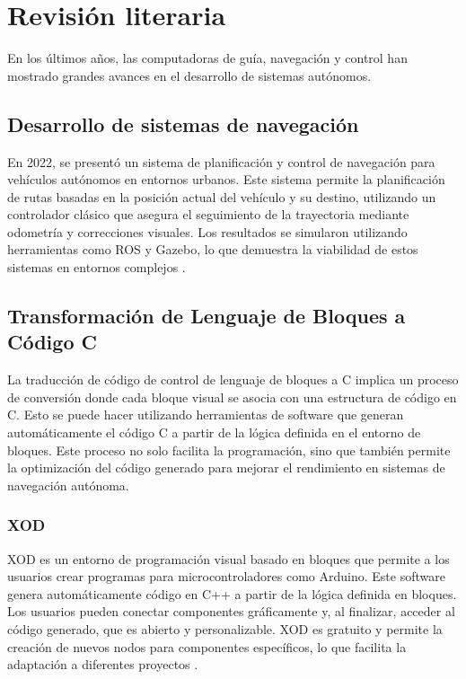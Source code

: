 \section{Revisión literaria}
En los últimos años, las computadoras de guía, navegación y control han mostrado grandes avances en el desarrollo de sistemas autónomos.

\subsection{Desarrollo de sistemas de navegación}

En 2022, se presentó un sistema de planificación y control de navegación para vehículos autónomos en entornos urbanos. Este sistema permite la planificación 
de rutas basadas en la posición actual del vehículo y su destino, utilizando un controlador clásico que asegura el seguimiento de la trayectoria mediante 
odometría y correcciones visuales. Los resultados se simularon utilizando herramientas como ROS y Gazebo, lo que demuestra la viabilidad de estos sistemas en 
entornos complejos \cite{BarreraRamrez2022SistemaDP}. 

\subsection{Transformación de Lenguaje de Bloques a Código C}

La traducción de código de control de lenguaje de bloques a C implica un proceso de conversión donde cada bloque visual se asocia con una estructura de código 
en C. Esto se puede hacer utilizando herramientas de software que generan automáticamente el código C a partir de la lógica definida en el entorno de bloques. 
Este proceso no solo facilita la programación, sino que también permite la optimización del código generado para mejorar el rendimiento en sistemas de navegación 
autónoma.

\subsubsection{XOD}

XOD es un entorno de programación visual basado en bloques que permite a los usuarios crear programas para microcontroladores como Arduino. Este software 
genera automáticamente código en C++ a partir de la lógica definida en bloques. Los usuarios pueden conectar componentes gráficamente y, al finalizar, acceder 
al código generado, que es abierto y personalizable. XOD es gratuito y permite la creación de nuevos nodos para componentes específicos, lo que facilita la 
adaptación a diferentes proyectos \cite{Snchez2020ProgramacinDL}.

